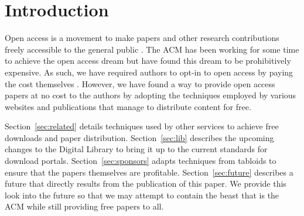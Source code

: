 \section{Introduction}
Open access is a movement to make papers and other research contributions
freely accessible to the general public \cite{oa}.
The ACM has been working for some time to achieve the open access dream but
have found this dream to be prohibitively expensive.
As such, we have required authors to opt-in to open access by paying the cost
themselves \cite{auth}.
However, we have found a way to provide open access papers at no cost to the
authors by adopting the techniques employed by various websites and
publications that manage to distribute content for free.

Section~\ref{sec:related} details techniques used by other services to achieve
free downloads and paper distribution.
Section~\ref{sec:lib} describes the upcoming changes to the Digital Library to
bring it up to the current standards for download portals.
Section~\ref{sec:sponsors} adapts techniques from tabloids to ensure that
the papers themselves are profitable.
Section~\ref{sec:future} describes a future that directly results from the
publication of this paper.
We provide this look into the future so that we may attempt to contain the
beast that is the ACM while still providing free papers to all.

